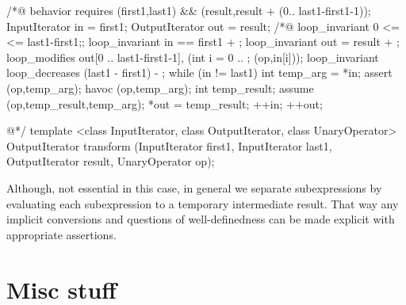 \begin{listing-nonumber}
	/*@ behavior
	requires \valid(first1,last1) && \valid(result,result + (0.. last1-first1-1));
	{
		InputIterator in = first1; 
		OutputIterator out = result;
		/*@ 
		loop_invariant 0 <= \count <= last1-first1;; 
		loop_invariant in == first1 + \count;
		loop_invariant out = result + \count;
		loop_modifies out[0 .. last1-first1-1], \union(int i = 0 .. ; \assigns(op,in[i]));
		loop_invariant 
		loop_decreases (last1 - first1) - \count;
		while (in != last1) {
			int temp_arg = *in;
	        assert \pre(op,temp_arg);
            havoc \assigns(op,temp_arg);
            int temp_result;
            assume \post(op,temp_result,temp_arg);
            *out = temp_result;
			++in;
			++out;
		}	
	}
	
	@*/	
	template <class InputIterator, class OutputIterator, class UnaryOperator>
	OutputIterator transform (InputIterator first1, InputIterator last1,
	OutputIterator result, UnaryOperator op);
\end{listing-nonumber}

Although, not essential in this case, in general we separate subexpressions by evaluating each subexpression to a temporary intermediate result. That way any implicit conversions and questions of well-definedness can be made explicit with appropriate assertions.
\section{Misc stuff}


